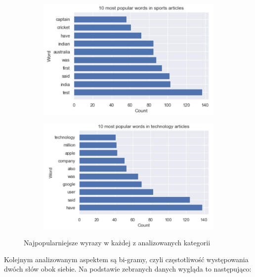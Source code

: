 \begin{figure}[H]\ContinuedFloat                 \begin{subfigure}[b]{0.7\textwidth}
         \centering
         \includegraphics[width=\textwidth]{images/analiza/sports.png}
     \end{subfigure}
     \hfill
     \begin{subfigure}[b]{0.7\textwidth}
         \centering
         \includegraphics[width=\textwidth]{images/analiza/technology.png}
     \end{subfigure}
        \caption{Najpopularniejsze wyrazy w każdej z analizowanych kategorii}
        \label{fig:10_most_popular_words}
\end{figure}

\newpage
\newpage
Kolejnym analizowanym aspektem są bi-gramy, czyli częstotliwość występowania dwóch słów obok siebie. Na podstawie zebranych danych wygląda to następująco:

